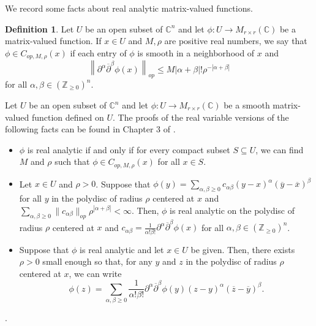 \documentclass{amsart}
\theoremstyle{definition}
\newtheorem{defn}[thm]{Definition}
\theoremstyle{remark}
\numberwithin{equation}{section}
\begin{document}
We record some facts about real analytic matrix-valued functions.

\begin{defn}
Let $U$ be an open subset of $\mathbb{C}^n$ and let $\phi : U \to M_{r \times r}(\mathbb{C})$ be a matrix-valued function. If $x \in U$ and $M,\rho$ are positive real numbers, we say that $\phi \in C_{op,M,\rho}(x)$ if each entry of $\phi$ is smooth in a neighborhood of $x$ and
\begin{equation}
\left \| \partial^\alpha \overline{\partial}^\beta \phi (x) \right \|_{op} \leq M |\alpha + \beta|! \rho^{-|\alpha + \beta|} \label{eq:coeffs}
\end{equation}
for all $\alpha,\beta \in (\mathbb{Z}_{\geq 0})^n$.
\end{defn}

Let $U$ be an open subset of $\mathbb{C}^n$ and let $\phi : U \to M_{r\times r}(\mathbb{C})$ be a smooth matrix-valued function defined on $U$. The proofs of the real variable versions of the following facts can be found in Chapter 3 of \cite{J}.

\begin{itemize}
    \item $\phi$ is real analytic if and only if for every compact subset $S \subseteq U$, we can find $M$ and $\rho$ such that $\phi \in C_{op,M,\rho}(x)$ for all $x \in S$.  
    \item Let $x \in U$ and $\rho > 0$. Suppose that $\phi(y) = \sum_{\alpha,\beta \geq 0} c_{\alpha\beta} (y-x)^\alpha (\overline{y} - \overline{x})^\beta$ for all $y$ in the polydisc of radius $\rho$ centered at $x$ and $\sum_{\alpha,\beta \geq 0} \| c_{\alpha\beta} \|_{op} \rho^{|\alpha + \beta|} < \infty$. Then, $\phi$ is real analytic on the polydisc of radius $\rho$ centered at $x$ and $c_{\alpha\beta} = \frac{1}{\alpha! \beta!} \partial^\alpha \overline{\partial}^\beta \phi(x)$ for all $\alpha,\beta \in (\mathbb{Z}_{\geq 0})^n$.
    \item Suppose that $\phi$ is real analytic and let $x \in U$ be given. Then, there exists $\rho > 0$ small enough so that, for any $y$ and $z$ in the polydisc of radius $\rho$ centered at $x$, we can write \begin{equation} \label{eq:series expansion}
    \phi(z) = \sum_{\alpha,\beta \geq 0} \frac{1}{\alpha!\beta!} \partial^\alpha \overline{\partial}^\beta \phi(y) (z-y)^\alpha (\overline{z}-\overline{y})^\beta.
    \end{equation}
\end{itemize}.
\end{document}

